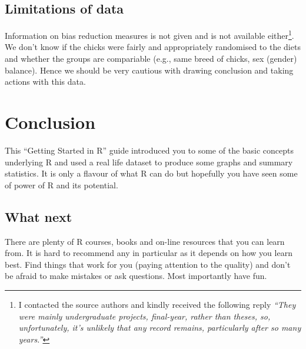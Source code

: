 \documentclass[a4paper,9pt,twocolumn,twoside,printwatermark=false]{pinp}
\begin{document}
\subsection{Limitations of data}\label{limitations-of-data}

Information on bias reduction measures is not given and is not available
either\footnote{I contacted the source authors and kindly received the
  following reply \emph{``They were mainly undergraduate projects,
  final-year, rather than theses, so, unfortunately, it's unlikely that
  any record remains, particularly after so many years.''}}. We don't
know if the chicks were fairly and appropriately randomised to the diets
and whether the groups are compariable (e.g., same breed of chicks, sex
(gender) balance). Hence we should be very cautious with drawing
conclusion and taking actions with this data.

\section{Conclusion}\label{conclusion}

This ``Getting Started in R'' guide introduced you to some of the basic
concepts underlying R and used a real life dataset to produce some
graphs and summary statistics. It is only a flavour of what R can do but
hopefully you have seen some of power of R and its potential.

\subsection{What next}\label{what-next}

There are plenty of R courses, books and on-line resources that you can
learn from. It is hard to recommend any in particular as it depends on
how you learn best. Find things that work for you (paying attention to
the quality) and don't be afraid to make mistakes or ask questions. Most
importantly have fun.

\end{document}
